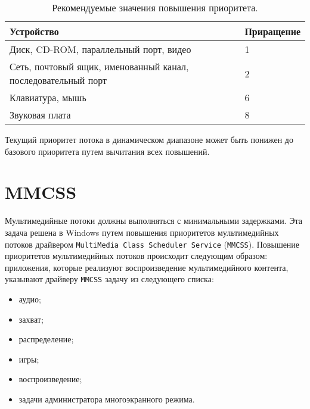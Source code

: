 \begin{table}[h]
    \caption{Рекомендуемые значения повышения приоритета.}
    \begin{center}
        \begin{tabular}{|p{100mm}|l|}
            \hline
            \textbf{Устройство} & \textbf{Приращение} \\
            \hline
            Диск, CD-ROM, параллельный порт, видео & 1 \\
            \hline
            Сеть, почтовый ящик, именованный канал, последовательный порт & 2 \\
            \hline
            Клавиатура, мышь & 6 \\
            \hline
            Звуковая плата & 8 \\
            \hline
        \end{tabular}
    \end{center}
    \label{tab:io}
\end{table}

Текущий приоритет потока в динамическом диапазоне может быть понижен до базового приоритета путем вычитания всех повышений.

\section{MMCSS}

Мультимедийные потоки должны выполняться с минимальными задержками. Эта задача решена в Windows путем повышения приоритетов мультимедийных потоков драйвером \texttt{MultiMedia Class Scheduler Service} (\texttt{MMCSS}). Повышение приоритетов мультимедийных потоков происходит следующим образом: приложения, которые реализуют воспроизведение мультимедийного контента, указывают драйверу \texttt{MMCSS} задачу из следующего списка:

\begin{itemize}
    \item аудио;
    \item захват;
    \item распределение;
    \item игры;
    \item воспроизведение;
    \item задачи администратора многоэкранного режима.
\end{itemize}

